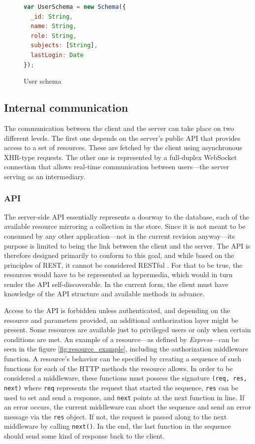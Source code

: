 \documentclass[thesis=M,english,hidelinks]{FITthesis}[2012/10/20]
\newcommand{\code}{\texttt}
\begin{document}
\begin{figure}
  \begin{lstlisting}[language=JavaScript]
var UserSchema = new Schema({
  _id: String,
  name: String,
  role: String,
  subjects: [String],
  lastLogin: Date
});
  \end{lstlisting}
  \caption{User schema}
  \label{fig:user_schema}
\end{figure}

    \subsection{Internal communication}

The communication between the client and the server can take place on two different levels. The first one depends on the server's public API that provides access to a set of resources. These are fetched by the client using asynchronous XHR-type requests. The other one is represented by a full-duplex WebSocket connection that allows real-time communication between users---the server serving as an intermediary.

      \subsubsection{API}

The server-side API essentially represents a doorway to the database, each of the available resource mirroring a collection in the store. Since it is not meant to be consumed by any other application---not in the current revision anyway---its purpose is limited to being the link between the client and the server. The API is therefore designed primarily to conform to this goal, and while based on the principles of REST, it cannot be considered RESTful \cite{rest}. For that to be true, the resources would have to be represented as hypermedia, which would in turn render the API self-discoverable. In the current form, the client must have knowledge of the API structure and available methods in advance.

Access to the API is forbidden unless authenticated, and depending on the resource and parameters provided, an additional authorization layer might be present. Some resources are available just to privileged users or only when certain conditions are met. An example of a resource---as defined by \textit{Express}---can be seen in the figure \ref{fig:resource_example}, including the authorization middleware function. A resource's behavior can be specified by creating a sequence of such functions for each of the HTTP methods the resource allows. In order to be considered a middleware, these functions must possess the signature \code{(req, res, next)} where \code{req} represents the request that started the sequence, \code{res} can be used to set and send a response, and \code{next} points at the next function in line. If an error occurs, the current middleware can abort the sequence and send an error message via the \code{res} object. If not, the request is passed along to the next middleware by calling \code{next()}. In the end, the last function in the sequence should send some kind of response back to the client.
\end{document}
